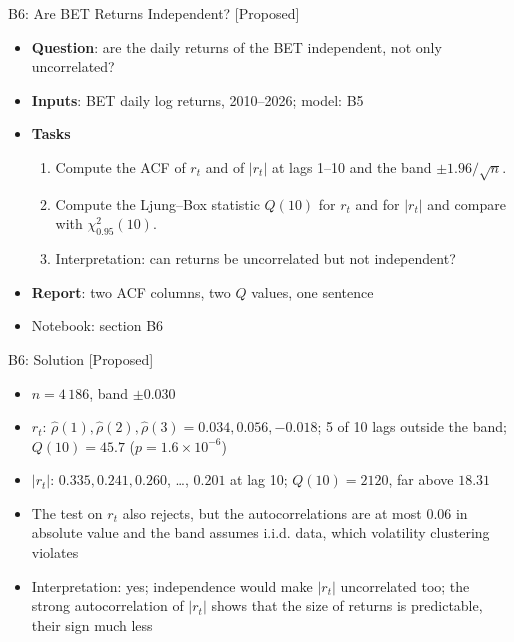 \begin{frame}{B6: Are BET Returns Independent? [Proposed]}
\itemsize{\footnotesize}
\begin{itemize}
\item \textbf{Question}: are the daily returns of the BET independent, not only uncorrelated?
\item \textbf{Inputs}: BET daily log returns, 2010--2026; model: B5
\item \textbf{Tasks}
\begin{enumerate}
    \item Compute the ACF of $r_t$ and of $|r_t|$ at lags 1--10 and the band $\pm 1.96/\sqrt n$.
    \item Compute the Ljung--Box statistic $Q(10)$ for $r_t$ and for $|r_t|$ and compare with $\chi^2_{0.95}(10)$.
    \item Interpretation: can returns be uncorrelated but not independent?
\end{enumerate}
\item \textbf{Report}: two ACF columns, two $Q$ values, one sentence
\item Notebook: section B6
\end{itemize}
\end{frame}

\ifsolutions
\begin{frame}{B6: Solution [Proposed]}
\itemsize{\footnotesize}
\begin{itemize}
    \item $n = 4\,186$, band $\pm 0.030$
    \item $r_t$: $\hat\rho(1), \hat\rho(2), \hat\rho(3) = 0.034, 0.056, -0.018$; 5 of 10 lags outside the band; $Q(10) = 45.7$ ($p = 1.6 \times 10^{-6}$)
    \item $|r_t|$: $0.335, 0.241, 0.260$, \dots, $0.201$ at lag 10; $Q(10) = 2120$, far above $18.31$
    \item The test on $r_t$ also rejects, but the autocorrelations are at most 0.06 in absolute value and the band assumes i.i.d. data, which volatility clustering violates
    \item Interpretation: yes; independence would make $|r_t|$ uncorrelated too; the strong autocorrelation of $|r_t|$ shows that the size of returns is predictable, their sign much less
\end{itemize}
\end{frame}
\fi

